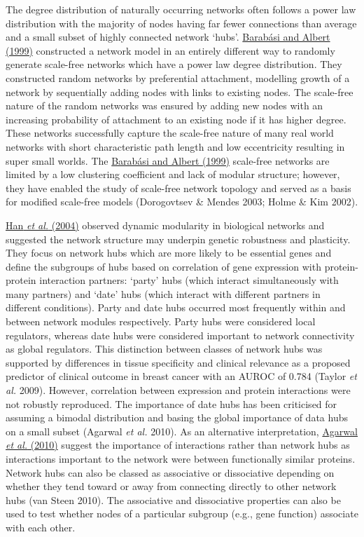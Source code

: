 The degree distribution of naturally occurring networks often follows a power law distribution with the majority of nodes having far fewer connections than average and a small subset of highly connected network {\textquoteleft}hubs{\textquoteright}. \hyperlink{ENREF7}{Barab\'asi and Albert (1999)} constructed a network model in an entirely different way to randomly generate scale-free networks which have a power law degree distribution. They constructed random networks by preferential attachment, modelling growth of a network by sequentially adding nodes with links to existing nodes. The scale-free nature of the random networks was ensured by adding new nodes with an increasing probability of attachment to an existing node if it has higher degree. These networks successfully capture the scale-free nature of many real world networks with short characteristic path length and low eccentricity resulting in super small worlds. The \hyperlink{ENREF7}{Barab\'asi and Albert (1999)} scale-free networks are limited by a low clustering coefficient and lack of modular structure; however, they have enabled the study of scale-free network topology and served as a basis for modified scale-free models (Dorogovtsev \& Mendes 2003; Holme \& Kim 2002). 


\hyperlink{ENREF47}{Han}\hyperlink{ENREF47}{\textit{ et al.}}\hyperlink{ENREF47}{ (2004)} observed dynamic modularity in biological networks and suggested the network structure may underpin genetic robustness and plasticity. They focus on network hubs which are more likely to be essential genes and define the subgroups of hubs based on correlation of gene expression with protein-protein interaction partners: {\textquoteleft}party{\textquoteright} hubs (which interact simultaneously with many partners) and {\textquoteleft}date{\textquoteright} hubs (which interact with different partners in different conditions). Party and date hubs occurred most frequently within and between network modules respectively. Party hubs were considered local regulators, whereas date hubs were considered important to network connectivity as global regulators. This distinction between classes of network hubs was supported by differences in tissue specificity and clinical relevance as a proposed predictor of clinical outcome in breast cancer with an AUROC of 0.784 (Taylor\textit{ et al.} 2009). However, correlation between expression and protein interactions were not robustly reproduced. The importance of date hubs has been criticised for assuming a bimodal distribution and basing the global importance of data hubs on a small subset (Agarwal\textit{ et al.} 2010). As an alternative interpretation, \hyperlink{ENREF2}{Agarwal}\hyperlink{ENREF2}{\textit{ et al.}}\hyperlink{ENREF2}{ (2010)} suggest the importance of interactions rather than network hubs as interactions important to the network were between functionally similar proteins. Network hubs can also be classed as associative or dissociative depending on whether they tend toward or away from connecting directly to other network hubs (van Steen 2010). The associative and dissociative properties can also be used to test whether nodes of a particular subgroup (e.g., gene function) associate with each other. 

